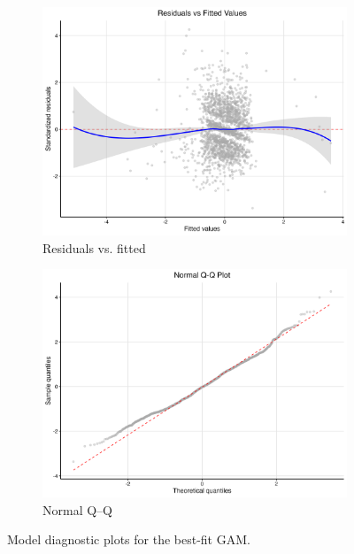 \begin{figure}[H]
  \centering
  \begin{subfigure}[b]{0.58\textwidth}
    \centering
    \includegraphics[width=\textwidth]{supplemental/results/thesis_exports/figures/residuals_vs_fitted.png}
    \caption{Residuals vs. fitted}
    \label{subfig:resid_fitted}
  \end{subfigure}\hfill
  \begin{subfigure}[b]{0.38\textwidth}
    \centering
    \includegraphics[width=\textwidth]{supplemental/results/thesis_exports/figures/qq_plot.png}
    \caption{Normal Q–Q}
    \label{subfig:qq}
  \end{subfigure}
  \caption{Model diagnostic plots for the best-fit GAM.}
  \label{fig:diagnostics}
  \end{figure}

